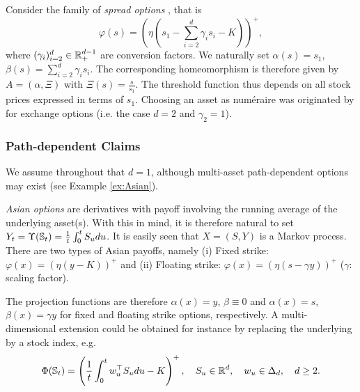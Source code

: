 \begin{example}\label{ex:spread}
Consider the family of \textit{spread options} \cite{Carmona},  that is 
$$
\varphi(s)= \left( \eta  \left ( s_1 - \sum_{i=2}^{d}\gamma_i s_i - K \right) \right)^{+},
$$
where  $(\gamma_{i})_{i=2}^d \in \operatorname{\mathbb{R}}^{d-1}_+$ are conversion factors. We naturally set $\alpha(s)=s_1$, $\beta(s)=\sum_{i=2}^{d}\gamma_i s_i$. The corresponding homeomorphism is therefore given by 
$A=(\alpha,\Xi)$ with  $\Xi(s)=\frac{s}{s_1}.$ The threshold function thus depends on all stock prices expressed in terms of $s_1$. 
Choosing an asset as numéraire %
was originated by \citet{Margrabe} for exchange options (i.e. the case $d=2$  and $\gamma_2=1$). 
\end{example}


\subsubsection*{Path-dependent Claims}
We assume throughout that $d=1$, although multi-asset path-dependent options may exist (see  Example \ref{ex:Asian}). 

\begin{example}\label{ex:Asian}
\textit{Asian options} 
are 
derivatives with payoff involving the running average of the  underlying asset(s).  With this in mind, it is therefore natural to set $Y_t=\Upsilon(\operatorname{\mathbb{S}}_t) = \frac{1}{t} \int_0^t S_u du$. It is easily seen that $X=(S,Y)$ is a Markov process.
There are two types of Asian payoffs, namely (i) Fixed strike: $\varphi(x) = \left(\eta (y - K)\right)^{+}$ and (ii) Floating strike:  $\varphi(x) = \left(\eta (s - \gamma y)\right)^{+}$ ($\gamma$: scaling factor).

The projection functions are therefore $\alpha(x)=y$, $\beta \equiv 0$ and  $\alpha(x)=s$, $\beta(x) = \gamma y$ for fixed and floating strike options, respectively.
A multi-dimensional extension  could be obtained for instance by replacing the underlying by a stock index, e.g.
$$ \Phi(\operatorname{\mathbb{S}}_t) = \left( \frac{1}{t} \int_0^t w_u^{\top} S_u du - K\right)^{+}, \quad S_u\in \operatorname{\mathbb{R}}^d, \quad w_u\in \Delta_{d},\quad d\ge 2.$$

\end{example}


